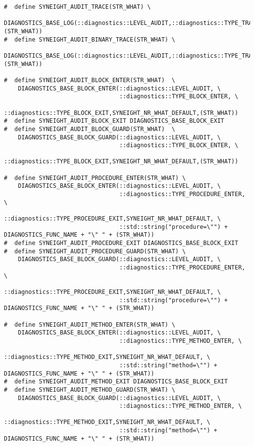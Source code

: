 \begin{verbatim}
#  define SYNEIGHT_AUDIT_TRACE(STR_WHAT) \
    DIAGNOSTICS_BASE_LOG(::diagnostics::LEVEL_AUDIT,::diagnostics::TYPE_TRACE,SYNEIGHT_NR_WHAT_DEFAULT,(STR_WHAT))
#  define SYNEIGHT_AUDIT_BINARY_TRACE(STR_WHAT) \
    DIAGNOSTICS_BASE_LOG(::diagnostics::LEVEL_AUDIT,::diagnostics::TYPE_TRACE_BINARY,SYNEIGHT_NR_WHAT_DEFAULT,(STR_WHAT))

#  define SYNEIGHT_AUDIT_BLOCK_ENTER(STR_WHAT)  \
    DIAGNOSTICS_BASE_BLOCK_ENTER(::diagnostics::LEVEL_AUDIT, \
                                 ::diagnostics::TYPE_BLOCK_ENTER, \
                                 ::diagnostics::TYPE_BLOCK_EXIT,SYNEIGHT_NR_WHAT_DEFAULT,(STR_WHAT))
#  define SYNEIGHT_AUDIT_BLOCK_EXIT DIAGNOSTICS_BASE_BLOCK_EXIT
#  define SYNEIGHT_AUDIT_BLOCK_GUARD(STR_WHAT)  \
    DIAGNOSTICS_BASE_BLOCK_GUARD(::diagnostics::LEVEL_AUDIT, \
                                 ::diagnostics::TYPE_BLOCK_ENTER, \
                                 ::diagnostics::TYPE_BLOCK_EXIT,SYNEIGHT_NR_WHAT_DEFAULT,(STR_WHAT))

#  define SYNEIGHT_AUDIT_PROCEDURE_ENTER(STR_WHAT) \
    DIAGNOSTICS_BASE_BLOCK_ENTER(::diagnostics::LEVEL_AUDIT, \
                                 ::diagnostics::TYPE_PROCEDURE_ENTER, \
                                 ::diagnostics::TYPE_PROCEDURE_EXIT,SYNEIGHT_NR_WHAT_DEFAULT, \
                                 ::std::string("procedure=\"") + DIAGNOSTICS_FUNC_NAME + "\" " + (STR_WHAT))
#  define SYNEIGHT_AUDIT_PROCEDURE_EXIT DIAGNOSTICS_BASE_BLOCK_EXIT
#  define SYNEIGHT_AUDIT_PROCEDURE_GUARD(STR_WHAT) \
    DIAGNOSTICS_BASE_BLOCK_GUARD(::diagnostics::LEVEL_AUDIT, \
                                 ::diagnostics::TYPE_PROCEDURE_ENTER, \
                                 ::diagnostics::TYPE_PROCEDURE_EXIT,SYNEIGHT_NR_WHAT_DEFAULT, \
                                 ::std::string("procedure=\"") + DIAGNOSTICS_FUNC_NAME + "\" " + (STR_WHAT))

#  define SYNEIGHT_AUDIT_METHOD_ENTER(STR_WHAT) \
    DIAGNOSTICS_BASE_BLOCK_ENTER(::diagnostics::LEVEL_AUDIT, \
                                 ::diagnostics::TYPE_METHOD_ENTER, \
                                 ::diagnostics::TYPE_METHOD_EXIT,SYNEIGHT_NR_WHAT_DEFAULT, \
                                 ::std::string("method=\"") + DIAGNOSTICS_FUNC_NAME + "\" " + (STR_WHAT))
#  define SYNEIGHT_AUDIT_METHOD_EXIT DIAGNOSTICS_BASE_BLOCK_EXIT
#  define SYNEIGHT_AUDIT_METHOD_GUARD(STR_WHAT) \
    DIAGNOSTICS_BASE_BLOCK_GUARD(::diagnostics::LEVEL_AUDIT, \
                                 ::diagnostics::TYPE_METHOD_ENTER, \
                                 ::diagnostics::TYPE_METHOD_EXIT,SYNEIGHT_NR_WHAT_DEFAULT, \
                                 ::std::string("method=\"") + DIAGNOSTICS_FUNC_NAME + "\" " + (STR_WHAT))


\end{verbatim}
